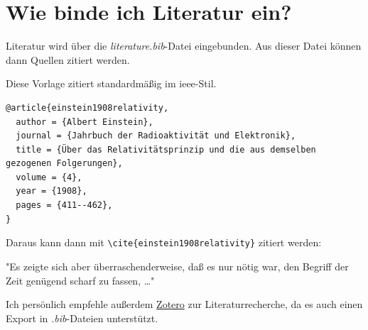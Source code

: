 \section{Wie binde ich Literatur ein?}
\label{sec:literatur}

Literatur wird über die \textit{literature.bib}-Datei eingebunden. Aus dieser Datei können dann Quellen zitiert werden.

Diese Vorlage zitiert standardmäßig im \gls{ieee}-Stil.

\begin{lstlisting}[caption=Beispiel für einen Eintrag in \textit{literature.bib}]
@article{einstein1908relativity,
  author = {Albert Einstein},
  journal = {Jahrbuch der Radioaktivität und Elektronik},
  title = {Über das Relativitätsprinzip und die aus demselben gezogenen Folgerungen},
  volume = {4},
  year = {1908},
  pages = {411--462},
}
\end{lstlisting}

Daraus kann dann mit \lstinline|\cite{einstein1908relativity}| zitiert werden:

"Es zeigte sich aber überraschenderweise, daß es nur nötig war, den Begriff der Zeit genügend scharf zu fassen, \dots" \cite{einstein1908relativity}

Ich persönlich empfehle außerdem \href{https://www.zotero.org/}{Zotero} zur Literaturrecherche, da es auch einen Export in \textit{.bib}-Dateien unterstützt.